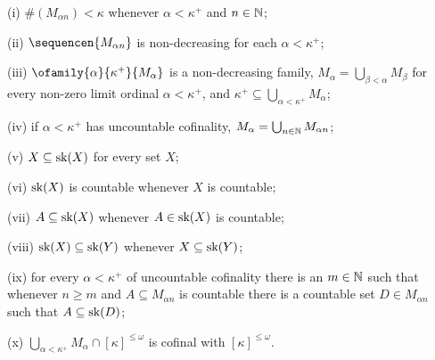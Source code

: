 (i) $\#(M_{\alpha n})<\kappa$ whenever $\alpha<\kappa^+$ and
$n\in\Bbb N$;

(ii) $\sequencen{M_{\alpha n}}$ is non-decreasing for each
$\alpha<\kappa^+$;

(iii) $\ofamily{\alpha}{\kappa^+}{M_{\alpha}}$ is a non-decreasing
family, $M_{\alpha}=\bigcup_{\beta<\alpha}M_{\beta}$ for every
non-zero limit ordinal $\alpha<\kappa^+$, and
$\kappa^+\subseteq\bigcup_{\alpha<\kappa^+}M_{\alpha}$;

(iv) if $\alpha<\kappa^+$ has uncountable cofinality,
$M_{\alpha}=\bigcup_{n\in\Bbb N}M_{\alpha n}$;

(v) $X\subseteq\mathop{\text{sk}}(X)$ for every set $X$;

(vi) $\mathop{\text{sk}}(X)$ is countable whenever $X$ is countable;

(vii) $A\subseteq\mathop{\text{sk}}(X)$ whenever $A\in\mathop{\text{sk}}(X)$ is countable;

(viii) $\mathop{\text{sk}}(X)\subseteq\mathop{\text{sk}}(Y)$ whenever $X\subseteq\mathop{\text{sk}}(Y)$;

(ix) for every $\alpha<\kappa^+$ of uncountable cofinality there is an
$m\in\Bbb N$ such that whenever $n\ge m$ and $A\subseteq M_{\alpha n}$
is countable there is a countable set $D\in M_{\alpha n}$ such that
$A\subseteq\mathop{\text{sk}}(D)$;

(x) $\bigcup_{\alpha<\kappa^+}M_{\alpha}\cap[\kappa]^{\le\omega}$ is
cofinal with $[\kappa]^{\le\omega}$.

